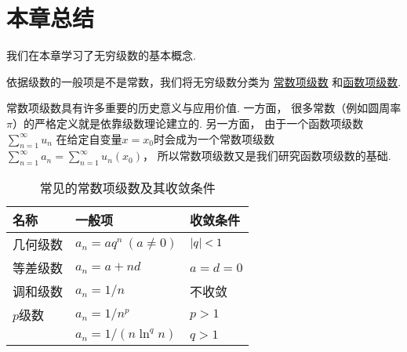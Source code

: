 \section{本章总结}

我们在本章学习了无穷级数的基本概念.

依据级数的一般项是不是常数，我们将无穷级数分类为%
\hyperref[definition:无穷级数.常数项级数的定义]{常数项级数}%
和\hyperref[definition:无穷级数.实函数项级数的概念]{函数项级数}.

常数项级数具有许多重要的历史意义与应用价值.
一方面，
很多常数（例如圆周率\(\pi\)）的严格定义就是依靠级数理论建立的.
另一方面，
由于一个函数项级数\(\sum_{n=1}^\infty u_n\)%
在给定自变量\(x=x_0\)时会成为一个常数项级数\(\sum_{n=1}^\infty a_n
= \sum_{n=1}^\infty u_n(x_0)\)，
所以常数项级数又是我们研究函数项级数的基础.

\begin{table}[h]
	\centering
	\begin{tabular}{*3l}
		\hline
		名称 & 一般项 & 收敛条件 \\ \hline
		几何级数 & \(a_n = a q^n\ (a\neq0)\) & \(\abs{q}<1\) \\ %
		等差级数 & \(a_n = a + n d\) & \(a = d = 0\) \\ %
		调和级数 & \(a_n = 1/n\) & 不收敛 \\ %
		\(p\)级数 & \(a_n = 1/n^p\) & \(p > 1\) \\ %
		& \(a_n = 1/(n \ln^q n)\) & \(q > 1\) \\ %
		\hline
	\end{tabular}
	\caption{常见的常数项级数及其收敛条件}
\end{table}

